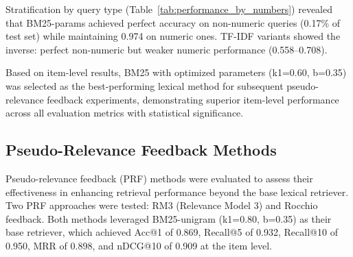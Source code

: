 \documentclass[preprint,12pt]{elsarticle}
\begin{document}
Stratification by query type (Table~\ref{tab:performance_by_numbers}) revealed that BM25-params achieved perfect accuracy on non-numeric queries (0.17\% of test set) while maintaining 0.974 on numeric ones. TF-IDF variants showed the inverse: perfect non-numeric but weaker numeric performance (0.558--0.708).

\begin{table}[htbp]
\centering
\caption{Item-level performance stratification by query type. The test set comprises 16,076 queries with numbers (99.83\%) and 29 queries without numbers (0.17\%).}
\label{tab:performance_by_numbers}
\end{table}

Based on item-level results, BM25 with optimized parameters (k1=0.60, b=0.35) was selected as the best-performing lexical method for subsequent pseudo-relevance feedback experiments, demonstrating superior item-level performance across all evaluation metrics with statistical significance.

\FloatBarrier
\subsection{Pseudo-Relevance Feedback Methods}

Pseudo-relevance feedback (PRF) methods were evaluated to assess their effectiveness in enhancing retrieval performance beyond the base lexical retriever. Two PRF approaches were tested: RM3 (Relevance Model 3) and Rocchio feedback. Both methods leveraged BM25-unigram (k1=0.80, b=0.35) as their base retriever, which achieved Acc@1 of 0.869, Recall@5 of 0.932, Recall@10 of 0.950, MRR of 0.898, and nDCG@10 of 0.909 at the item level.
\end{document}
